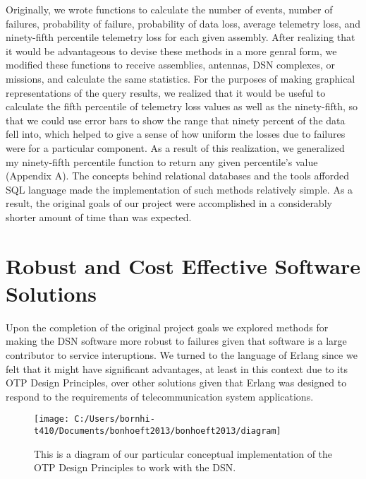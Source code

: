 \documentclass[aps,twocolumn,nobalancelastpage,amsmath,amssymb,
nofootinbib,superscriptaddress, ]{revtex4}
\begin{document}
Originally, we wrote functions to calculate the number of events, number of failures, probability of failure, probability of data loss, average telemetry loss, and ninety-fifth percentile telemetry loss for each given assembly. After realizing that it would be advantageous to devise these methods in a more genral form, we  modified these functions to receive assemblies, antennas, DSN complexes, or missions, and calculate the same statistics. For the purposes of making graphical representations of the query results, we realized that it would be useful to calculate the fifth percentile of telemetry loss values as well as the ninety-fifth, so that we could use error bars to show the range that ninety percent of the data fell into, which helped to give a sense of how uniform the losses due to failures were for a particular component. As a result of this realization, we generalized my ninety-fifth percentile function to return any given percentile’s value (Appendix A). The concepts behind relational databases and the tools afforded SQL language made the implementation of such methods relatively simple. As a result, the original goals of our project were accomplished in a considerably shorter amount of time than was expected.


\section{Robust and Cost Effective Software Solutions}

Upon the completion of the original project goals we explored methods for making the DSN software more robust to failures given that software is a large contributor to service interuptions. We turned to the language of Erlang since we felt that it might have significant advantages, at least in this context due to its OTP Design Principles, over other solutions given that Erlang was designed to respond to the requirements of telecommunication system applications. \cite{armstrong2003}

\begin{figure}[h]
\texttt{[image: C:/Users/bornhi-t410/Documents/bonhoeft2013/bonhoeft2013/diagram]}
\caption{This is a diagram of our particular conceptual implementation of the OTP Design Principles to work with the DSN. \label{fig:diagram}}
\end{figure}
\end{document}
